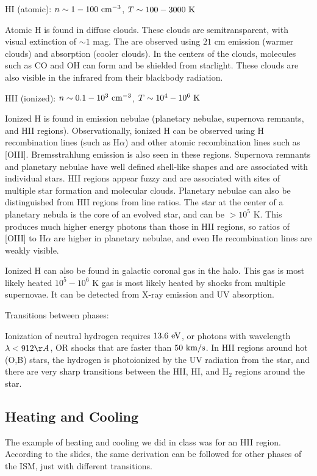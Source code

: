 HI (atomic): $n \sim 1-100~{\rm cm}^{-3}$, $T \sim 100-3000~{\rm K}$

Atomic H is found in diffuse clouds.  These clouds are semitransparent, with 
visual extinction of $\sim1$ mag.  The are observed using $21$ cm emission 
(warmer clouds) and absorption (cooler clouds).  In the centers of the clouds, 
molecules such as CO and OH can form and be shielded from starlight.  These 
clouds are also visible in the infrared from their blackbody radiation.  
 
HII (ionized): $n \sim 0.1-10^3~{\rm cm}^{-3}$, $T \sim 10^4-10^6~{\rm K}$

Ionized H is found in emission nebulae (planetary nebulae, supernova remnants, 
and HII regions).  Observationally, ionized H can be observed using H 
recombination lines (such as H$\alpha$) and other atomic recombination lines 
such as [OIII].  Bremsstrahlung emission is also seen in these regions.  
Supernova remnants and planetary nebulae have well defined shell-like shapes 
and are associated with individual stars.  HII regions appear fuzzy and 
are associated with sites of multiple star formation and molecular clouds.  
Planetary nebulae can also be distinguished from HII regions from line ratios.  
The star at the center of a planetary nebula is the core of an evolved star, 
and can be $>10^5$ K.  This produces much higher energy photons than those 
in HII regions, so ratios of [OIII] to H$\alpha$ are higher in planetary 
nebulae, and even He recombination lines are weakly visible.  

Ionized H can also be found in galactic coronal gas in the halo.  This gas 
is most likely heated $10^5-10^6$ K gas is most likely heated by shocks from 
multiple supernovae.  It can be detected from X-ray emission and UV absorption.
 
 Transitions between phases:
 
 Ionization of neutral hydrogen requires $13.6~{\rm eV}$, or photons with wavelength $\lambda < 912 \AA$, OR shocks that are faster than $50~{\rm km/s}$. In HII regions around hot (O,B) stars, the hydrogen is photoionized by the UV radiation from the star, and there are very sharp transitions between the HII, HI, and H$_2$ regions around the star.

\subsection{Heating and Cooling}
The example of heating and cooling we did in class was for an HII region.  
According to the slides, the same derivation can be followed for other 
phases of the ISM, just with different transitions.  

